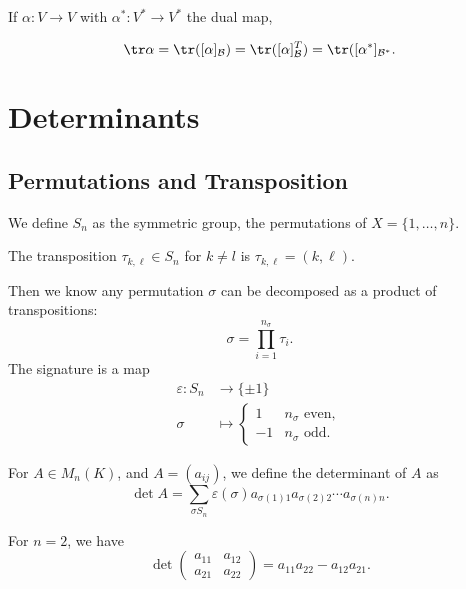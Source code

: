 \documentclass[12pt]{article}
\begin{document}
\begin{lemma}
	If $\alpha : V \to V$ with $\alpha^{\ast} : V^{\ast} \to V^{\ast}$ the dual map,
\end{lemma}

\begin{proofbox}
	\[
		\tr \alpha = \tr([\alpha]_{\mathcal{B}}) = \tr([\alpha]_{\mathcal{B}}^{T}) = \tr([\alpha^{\ast}]_{\mathcal{B}^{\ast}}
	.\]
\end{proofbox}

\newpage

\section{Determinants}%
\label{sec:determinants}

\subsection{Permutations and Transposition}%
\label{sub:permutations_and_transposition}

We define $S_n$ as the symmetric group, the permutations of $X = \{1, \ldots, n\}$.

The transposition $\tau_{k, \ell} \in S_n$ for $k \neq l$ is $\tau_{k, \ell} = (k, \ell)$.

Then we know any permutation $\sigma$ can be decomposed as a product of transpositions:
\[
\sigma = \prod_{i = 1}^{n_{\sigma}} \tau_i
.\]
The signature is a map
\begin{align*}
	\varepsilon : S_n &\to \{\pm 1\} \\
	\sigma &\mapsto
	\begin{cases}
		1 & n_{\sigma} \text{ even},\\
		-1 & n_{\sigma} \text{ odd}.
	\end{cases}
\end{align*}

\begin{definition}
	For $A \in M_{n}(K)$, and $A = (a_{ij})$, we define the determinant of $A$ as
	\[
		\det A = \sum_{\sigma S_n}\varepsilon(\sigma)a_{\sigma(1) 1} a_{\sigma(2) 2} \cdots a_{\sigma(n) n}
	.\]
\end{definition}

\begin{exbox}
	For $n = 2$, we have
	\[
	\det
	\begin{pmatrix}
		a_{11} & a_{12} \\
		a_{21} & a_{22}
	\end{pmatrix}
	= a_{11}a_{22} - a_{12}a_{21}
	.\]
\end{exbox}
\end{document}
